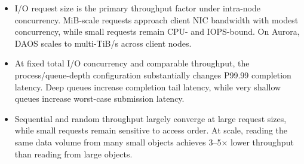 \begin{itemize}
\item I/O request size is the primary throughput factor under intra-node concurrency. MiB-scale requests approach client NIC bandwidth with modest concurrency, while small requests remain CPU- and IOPS-bound. On Aurora, DAOS scales to multi-TiB/s across client nodes.
\item At fixed total I/O concurrency and comparable throughput, the process/queue-depth configuration substantially changes P99.99 completion latency. Deep queues increase completion tail latency, while very shallow queues increase worst-case submission latency.
\item Sequential and random throughput largely converge at large request sizes, while small requests remain sensitive to access order. At scale, reading the same data volume from many small objects achieves 3--5$\times$ lower throughput than reading from large objects.
\end{itemize}
